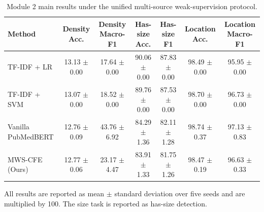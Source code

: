 \begin{table}[htbp]
\centering
\small
\caption{Module 2 main results under the unified multi-source weak-supervision protocol.}
\label{tab:module2-main}
\begin{tabular}{lcccccc}
\hline
Method & Density Acc. & Density Macro-F1 & Has-size Acc. & Has-size F1 & Location Acc. & Location Macro-F1 \\
\hline
TF-IDF + LR & 13.13 $\pm$ 0.00 & 17.64 $\pm$ 0.00 & 90.06 $\pm$ 0.00 & 87.83 $\pm$ 0.00 & 98.49 $\pm$ 0.00 & 95.95 $\pm$ 0.00 \\
TF-IDF + SVM & 13.07 $\pm$ 0.00 & 18.52 $\pm$ 0.00 & 89.76 $\pm$ 0.00 & 87.53 $\pm$ 0.00 & 98.70 $\pm$ 0.00 & 96.73 $\pm$ 0.00 \\
Vanilla PubMedBERT & 12.76 $\pm$ 0.09 & 43.76 $\pm$ 6.92 & 84.29 $\pm$ 1.36 & 82.11 $\pm$ 1.28 & 98.74 $\pm$ 0.37 & 97.13 $\pm$ 0.83 \\
MWS-CFE (Ours) & 12.77 $\pm$ 0.06 & 23.17 $\pm$ 4.47 & 83.91 $\pm$ 1.33 & 81.75 $\pm$ 1.26 & 98.47 $\pm$ 0.19 & 96.63 $\pm$ 0.33 \\
\hline
\end{tabular}
\vspace{0.4em}
\parbox{0.96\linewidth}{\footnotesize
All results are reported as mean $\pm$ standard deviation over five seeds and are multiplied by 100. The size task is reported as has-size detection.}
\end{table}
